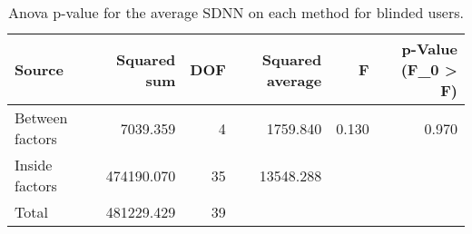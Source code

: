 
\begin{table}[!htb]
\centering
\caption{Anova p-value for the average SDNN on each method for blinded users.}
\label{tab:anova_average_SDNN}
\begin{tabular}{lrrrrr}
\toprule
         Source &  Squared sum &  DOF & Squared average &     F & p-Value (F\_0 > F) \\
\midrule
Between factors &     7039.359 &    4 &        1759.840 & 0.130 &             0.970 \\
 Inside factors &   474190.070 &   35 &       13548.288 &       &                   \\
          Total &   481229.429 &   39 &                 &       &                   \\
\bottomrule
\end{tabular}
\end{table}

